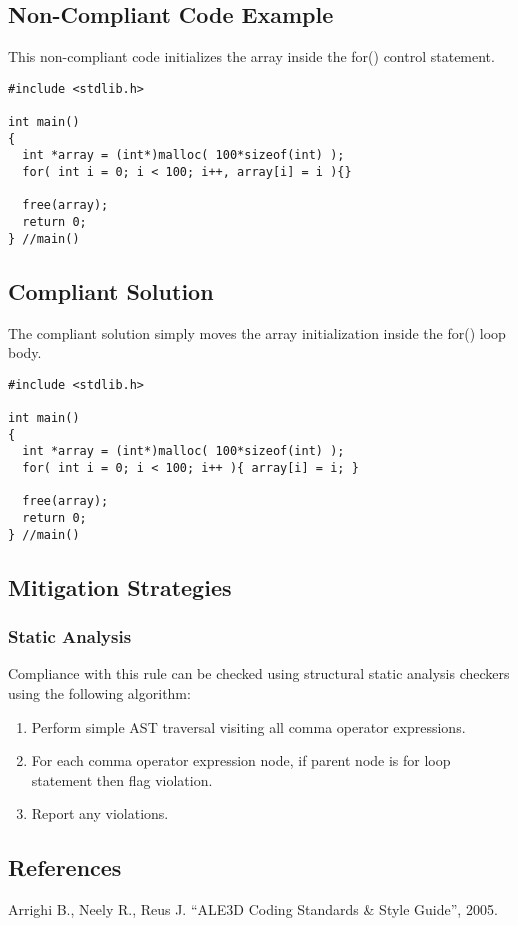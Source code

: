 \subsection{Non-Compliant Code Example}
This non-compliant code initializes the array inside the for() control statement.

\begin{verbatim}
#include <stdlib.h>

int main()
{
  int *array = (int*)malloc( 100*sizeof(int) );
  for( int i = 0; i < 100; i++, array[i] = i ){}

  free(array);
  return 0;
} //main()
\end{verbatim}

\subsection{Compliant Solution}
The compliant solution simply moves the array initialization inside the for() loop body.

\begin{verbatim}
#include <stdlib.h>

int main()
{
  int *array = (int*)malloc( 100*sizeof(int) );
  for( int i = 0; i < 100; i++ ){ array[i] = i; }

  free(array);
  return 0;
} //main()
\end{verbatim}

\subsection{Mitigation Strategies}
\subsubsection{Static Analysis} 

Compliance with this rule can be checked using structural static analysis checkers using the following algorithm:

\begin{enumerate}
\item Perform simple AST traversal visiting all comma operator expressions.
\item For each comma operator expression node, if parent node is for loop statement then flag violation.
\item Report any violations. 
\end{enumerate}

\subsection{References}

Arrighi B., Neely R., Reus J. ``ALE3D Coding Standards \& Style Guide'', 2005.
